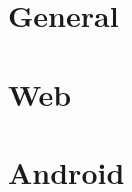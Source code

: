 




\maketitle
\tableofcontents

% 
\part{General}










\part{Web}







\part{Android}



\cleardoublepage
\begin{appendices}
	\listofprograms
\end{appendices}


